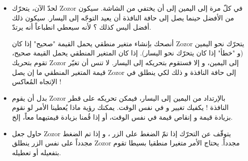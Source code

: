 \begin{itemize}
	\item  لحدّ الآن، يتحرّك 
	\textenglish{Zozor}
	في كلّ مرة إلى اليمين إلى أن يختفي من الشاشة. سيكون من الأفضل حينما يصل إلى حافة النافذة أن يعيد التوجّه إلى اليسار. سيكون ذلك أفضل أليس كذلك ؟ لأنه سيعطي انطباعاً أنه يرتدّ.
	
	أنصحك بإنشاء متغير منطقي
	يحمل القيمة "صحيح" إذا كان 
	\textenglish{Zozor}
	يتحرّك نحو اليمين (و "خطأ" إذا كان يتحرّك نحو اليسار). إذا كان المتغير المنطقي يحمل القيمة صحيح، تقوم بتحريك
	\textenglish{Zozor}
	إلى اليمين، و إلا فستقوم بتحريكه إلى اليسار. لا تنس أن تغيّر قيمة المتغير المنطقي ما إن يصل
	\textenglish{Zozor}
	إلى حافة النافذة و ذلك لكي ينطلق في الإتجاه المُعاكس !
	\item بدل أن يقوم 
	\textenglish{Zozor} 
	بالإرتداد من اليمين إلى اليسار، فيمكن تحريكه على قطر النافذة ! يكفيك تغيير 
	و 
	في نفس الوقت. يمكنك رؤية ماذا يُعطينا الأمر لو نقوم بزيادة قيمة 
	و إنقاص قيمة 
	في نفس الوقت، أو إذا قُمنا بزيادة قيمتيهما معاً، إلخ.
	\item حاول جعل
	\textenglish{Zozor}
	يتوقّف عن التحرّك إذا تمّ الضغط على الزر
	،
	و إذا تم الضغط مجدداً على نفس الزر ينطلق
	\textenglish{Zozor} 
	مجدداً. يحتاج الأمر متغيرا منطقيا بسيطا تقوم بتفعيله أو تعطيله.
\end{itemize}
